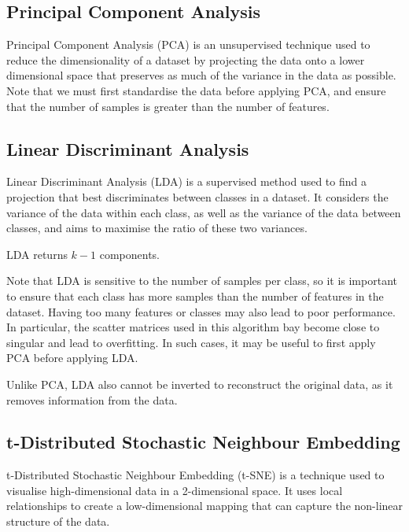 \documentclass{article}
\begin{document}
\subsection{Principal Component Analysis}
Principal Component Analysis (PCA) is an unsupervised technique used to
reduce the dimensionality of a dataset by projecting the data onto a
lower dimensional space that preserves as much of the variance in the
data as possible.
Note that we must first standardise the data before applying PCA, and
ensure that the number of samples is greater than the number of features.
\subsection{Linear Discriminant Analysis}
Linear Discriminant Analysis (LDA) is a supervised method used to find a
projection that best discriminates between classes in a dataset. It
considers the variance of the data within each class, as well as the
variance of the data between classes, and aims to maximise the ratio of
these two variances.

LDA returns \(k - 1\) components.

Note that LDA is sensitive to the number of samples per class, so it is
important to ensure that each class has more samples than the number of
features in the dataset. Having too many features or classes may also
lead to poor performance. In particular, the scatter matrices used in this
algorithm bay become close to singular and lead to overfitting. In such
cases, it may be useful to first apply PCA before applying LDA.

Unlike PCA, LDA also cannot be inverted to reconstruct the original data,
as it removes information from the data.
\subsection{t-Distributed Stochastic Neighbour Embedding}
t-Distributed Stochastic Neighbour Embedding (t-SNE) is a technique
used to visualise high-dimensional data in a 2-dimensional space. It uses
local relationships to create a low-dimensional mapping that can capture
the non-linear structure of the data.
\end{document}
